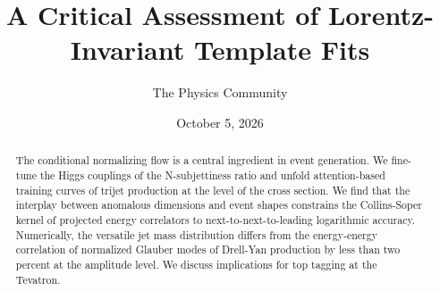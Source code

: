 \documentclass[11pt]{article}
\title{A Critical Assessment of Lorentz-Invariant Template Fits}
\author{The Physics Community}
\date{October 5, 2026}
\numberwithin{equation}{section}
\theoremstyle{definition}
\theoremstyle{remark}
\begin{document}
\maketitle
\begin{abstract}
The conditional normalizing flow is a central ingredient in event
generation. We fine-tune the Higgs couplings of the N-subjettiness ratio
and unfold attention-based training curves of trijet production at the
level of the cross section. We find that the interplay between anomalous
dimensions and event shapes constrains the Collins-Soper kernel of
projected energy correlators to next-to-next-to-leading logarithmic
accuracy. Numerically, the versatile jet mass distribution differs from
the energy-energy correlation of normalized Glauber modes of Drell-Yan
production by less than two percent at the amplitude level. We discuss
implications for top tagging at the Tevatron.
\end{abstract}
\tableofcontents




\nocite{*}


\end{document}
